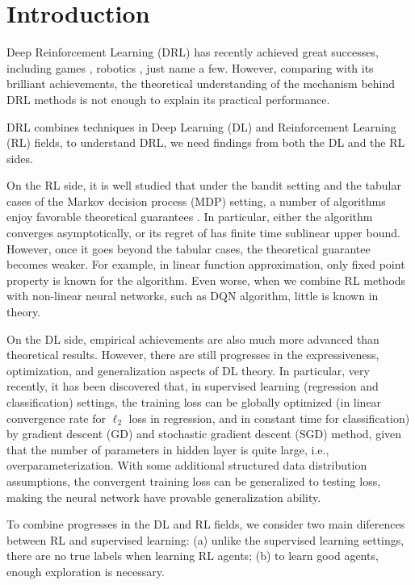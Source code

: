 \section{Introduction}
\label{introduction}

Deep Reinforcement Learning (DRL) has recently achieved great successes, including games \citep{silver2016masteringA,silver2017masteringB,moravvcik2017deepstack,mnih2015human}, robotics \citep{lillicrap2015continuous,levine2016end}, just name a few. However, comparing with its brilliant achievements, the theoretical understanding of the mechanism behind DRL methods is not enough to explain its practical performance. 

DRL combines techniques in Deep Learning (DL) and Reinforcement Learning (RL) fields, to understand DRL, we need findings from both the DL and the RL sides.

On the RL side, it is well studied that under the bandit setting and the tabular cases of the Markov decision process (MDP) setting, a number of algorithms enjoy favorable theoretical guarantees \citep{bubeck2012regret}. In particular, either the algorithm converges asymptotically, or its regret of has finite time sublinear upper bound. However, once it goes beyond the tabular cases, the theoretical guarantee becomes weaker. For example, in linear function approximation, only fixed point property is known for the algorithm. Even worse, when we combine RL methods with non-linear neural networks, such as DQN algorithm, little is known in theory.

On the DL side, empirical achievements are also much more advanced than theoretical results. However, there are still progresses in the expressiveness, optimization, and generalization aspects of DL theory. In particular, very recently, it has been discovered that, in supervised learning (regression and classification) settings, the training loss can be globally optimized (in linear convergence rate for $\ell_2$ loss in regression, and in constant time for classification) by gradient descent (GD) and stochastic gradient descent (SGD) method, given that the number of parameters in hidden layer is quite large, i.e., overparameterization. With some additional structured data distribution assumptions, the convergent training loss can be generalized to testing loss, making the neural network have provable generalization ability. 

To combine progresses in the DL and RL fields, we consider two main diferences between RL and supervised learning: (a) unlike the supervised learning settings, there are no true labels when learning RL agents; (b) to learn good agents, enough exploration is necessary.

